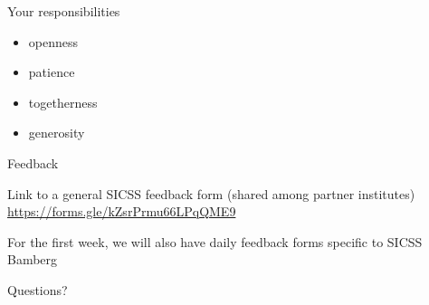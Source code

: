 \documentclass{beamer}
\begin{document}
\begin{frame}{Your responsibilities}

\begin{itemize}
\item openness
\item patience
\item togetherness
\item generosity
\end{itemize}

\end{frame}

\begin{frame}{Feedback}

Link to a general SICSS feedback form (shared among partner institutes)
\url{https://forms.gle/kZsrPrmu66LPqQME9}

\vspace{2mm}
For the first week, we will also have daily feedback forms specific to SICSS Bamberg

\end{frame}


\begin{frame}[standout]

\begin{center}
\LARGE
Questions?
\end{center}

\end{frame}
\end{document}
